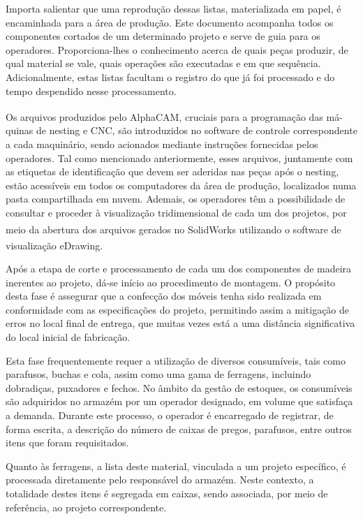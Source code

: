 Importa salientar que uma reprodução dessas listas, materializada em papel, é encaminhada para a área de produção. Este documento acompanha todos os componentes cortados de um determinado projeto e serve de guia para os operadores. Proporciona-lhes o conhecimento acerca de quais peças produzir, de qual material se vale, quais operações são executadas e em que sequência. Adicionalmente, estas listas facultam o registro do que já foi processado e do tempo despendido nesse processamento.


Os arquivos produzidos pelo AlphaCAM\textsuperscript{\textregistered}, cruciais para a programação das má-\\quinas de nesting e CNC, são introduzidos no software de controle correspondente a cada maquinário, sendo acionados mediante instruções fornecidas pelos operadores. Tal como mencionado anteriormente, esses arquivos, juntamente com as etiquetas de identificação que devem ser aderidas nas peças após o nesting, estão acessíveis em todos os computadores da área de produção, localizados numa pasta compartilhada em nuvem. Ademais, os operadores têm a possibilidade de consultar e proceder à visualização tridimensional de cada um dos projetos, por meio da abertura dos arquivos gerados no SolidWorks\textsuperscript{\textregistered} utilizando o software de visualização eDrawing\textsuperscript{\textregistered}.


Após a etapa de corte e processamento de cada um dos componentes de madeira inerentes ao projeto, dá-se início ao procedimento de montagem. O propósito desta fase é assegurar que a confecção dos móveis tenha sido realizada em conformidade com as especificações do projeto, permitindo assim a mitigação de erros no local final de entrega, que muitas vezes está a uma distância significativa do local inicial de fabricação.

Esta fase frequentemente requer a utilização de diversos consumíveis, tais como parafusos, buchas e cola, assim como uma gama de ferragens, incluindo dobradiças, puxadores e fechos. No âmbito da gestão de estoques, os consumíveis são adquiridos no armazém por um operador designado, em volume que satisfaça a demanda. Durante este processo, o operador é encarregado de registrar, de forma escrita, a descrição do número de caixas de pregos, parafusos, entre outros itens que foram requisitados.

Quanto às ferragens, a lista deste material, vinculada a um projeto específico, é processada diretamente pelo responsável do armazém. Neste contexto, a totalidade destes itens é segregada em caixas, sendo associada, por meio de referência, ao projeto correspondente.


